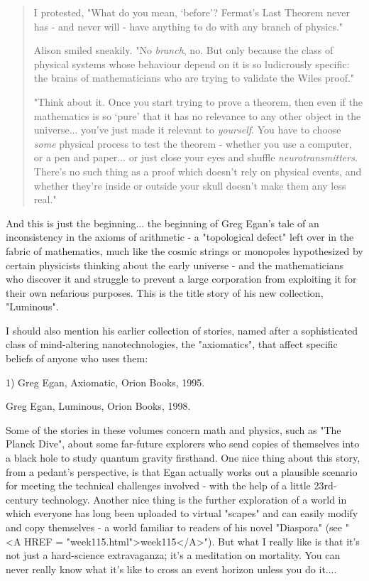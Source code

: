 \begin{quote}
     I protested, "What do you mean, `before'?  Fermat's Last Theorem
     never has - and never will - have anything to do with any branch 
     of physics."

     Alison smiled sneakily.  "No \emph{branch}, no.  But only because the 
     class of physical systems whose behaviour depend on it is so 
     ludicrously specific: the brains of mathematicians who are trying
     to validate the Wiles proof."

     "Think about it.  Once you start trying to prove a theorem, then
     even if the mathematics is so `pure' that it has no relevance to
     any other object in the universe... you've just made it relevant
     to \emph{yourself}.  You have to choose \emph{some} physical process to test
     the theorem - whether you use a computer, or a pen and paper... or
     just close your eyes and shuffle \emph{neurotransmitters}.  There's no
     such thing as a proof which doesn't rely on physical events, and
     whether they're inside or outside your skull doesn't make them
     any less real."
\end{quote}
And this is just the beginning... the beginning of Greg Egan's tale of
an inconsistency in the axioms of arithmetic - a "topological defect"
left over in the fabric of mathematics, much like the cosmic strings or
monopoles hypothesized by certain physicists thinking about the early
universe - and the mathematicians who discover it and struggle to
prevent a large corporation from exploiting it for their own nefarious
purposes.  This is the title story of his new collection, "Luminous".

I should also mention his earlier collection of stories, named after a
sophisticated class of mind-altering nanotechnologies, the "axiomatics",
that affect specific beliefs of anyone who uses them:

1) Greg Egan, Axiomatic, Orion Books, 1995.

Greg Egan, Luminous, Orion Books, 1998.

Some of the stories in these volumes concern math and physics, such as
"The Planck Dive", about some far-future explorers who send copies of
themselves into a black hole to study quantum gravity firsthand.  One
nice thing about this story, from a pedant's perspective, is that Egan
actually works out a plausible scenario for meeting the technical
challenges involved - with the help of a little 23rd-century technology.
Another nice thing is the further exploration of a world in which
everyone has long been uploaded to virtual "scapes" and can easily
modify and copy themselves - a world familiar to readers of his novel
"Diaspora" (see "<A HREF = "week115.html">week115</A>").  But what I really like is that it's not
just a hard-science extravaganza; it's a meditation on mortality.  You
can never really know what it's like to cross an event horizon unless 
you do it....

